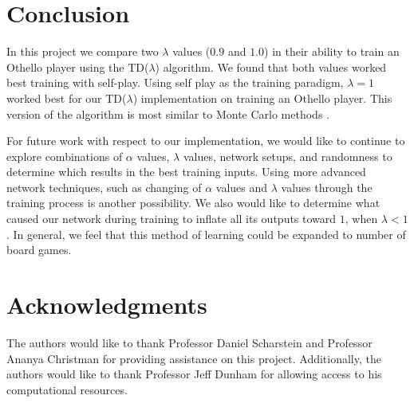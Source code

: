 \documentclass{sig-alternate-05-2015}
\begin{document}
\section{Conclusion}

In this project we compare two  $\lambda$ values ($0.9$ and $1.0$) in their ability to train an Othello player using the TD($\lambda$) algorithm. We found that both values worked best training with self-play. Using self play as the training paradigm, $\lambda  = 1$ worked best for our TD($\lambda$) implementation on training an Othello player. This version of the algorithm is most similar to Monte Carlo methods \cite{sutton1998reinforcement} .

For future work with respect to our implementation, we would like to continue to explore combinations of $\alpha$ values, $\lambda$ values, network setups, and randomness to determine which results in the best training inputs. Using more advanced network techniques, such as changing of $\alpha$ values and $\lambda$ values through the training process is another possibility. We also would like to determine what caused our network during training to inflate all its outputs toward $1$, when $\lambda < 1$. In general, we feel that this method of learning could be expanded to number of board games.


\section{Acknowledgments}

The authors would like to thank Professor Daniel Scharstein and Professor Ananya Christman for providing assistance on this project. Additionally, the authors would like to thank Professor Jeff Dunham for allowing access to his computational resources.
\nocite{*}

\end{document}
